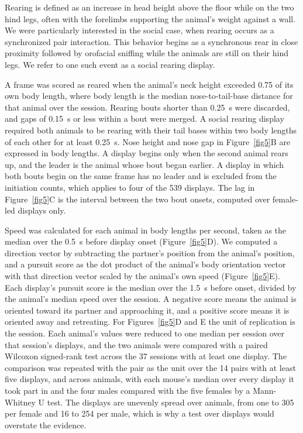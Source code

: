 \documentclass[pdflatex, sn-nature]{sn-jnl}
\theoremstyle{thmstyleone}%
\theoremstyle{thmstyletwo}%
\theoremstyle{thmstylethree}%
\begin{document}
Rearing is defined as an increase in head height above the floor while on the two hind legs, often with the forelimbs supporting the animal's weight against a wall. We were particularly interested in the social case, when rearing occurs as a synchronized pair interaction. This behavior begins as a synchronous rear in close proximity followed by orofacial sniffing while the animals are still on their hind legs. We refer to one such event as a social rearing display.

A frame was scored as reared when the animal's neck height exceeded 0.75 of its own body length, where body length is the median nose-to-tail-base distance for that animal over the session. Rearing bouts shorter than 0.25~s were discarded, and gaps of 0.15~s or less within a bout were merged. A social rearing display required both animals to be rearing with their tail bases within two body lengths of each other for at least 0.25~s. Nose height and nose gap in Figure~\ref{fig5}B are expressed in body lengths. A display begins only when the second animal rears up, and the leader is the animal whose bout began earlier. A display in which both bouts begin on the same frame has no leader and is excluded from the initiation counts, which applies to four of the 539 displays. The lag in Figure~\ref{fig5}C is the interval between the two bout onsets, computed over female-led displays only.

Speed was calculated for each animal in body lengths per second, taken as the median over the 0.5~s before display onset (Figure~\ref{fig5}D). We computed a direction vector by subtracting the partner's position from the animal's position, and a pursuit score as the dot product of the animal's body orientation vector with that direction vector scaled by the animal's own speed (Figure~\ref{fig5}E). Each display's pursuit score is the median over the 1.5~s before onset, divided by the animal's median speed over the session. A negative score means the animal is oriented toward its partner and approaching it, and a positive score means it is oriented away and retreating. For Figures~\ref{fig5}D and E the unit of replication is the session. Each animal's values were reduced to one median per session over that session's displays, and the two animals were compared with a paired Wilcoxon signed-rank test across the 37 sessions with at least one display. The comparison was repeated with the pair as the unit over the 14 pairs with at least five displays, and across animals, with each mouse's median over every display it took part in and the four males compared with the five females by a Mann-Whitney U test. The displays are unevenly spread over animals, from one to 305 per female and 16 to 254 per male, which is why a test over displays would overstate the evidence.
\end{document}
